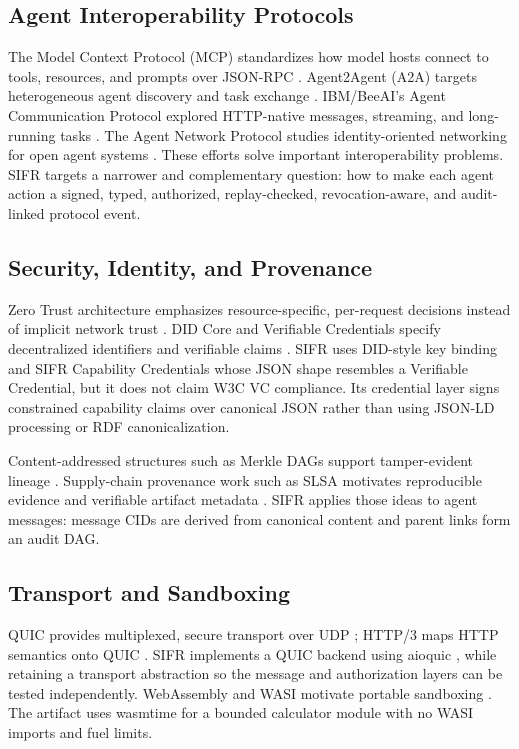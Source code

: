 \documentclass[runningheads]{llncs}
\begin{document}
\subsection{Agent Interoperability Protocols}

The Model Context Protocol (MCP) standardizes how model hosts connect to tools, resources, and prompts over JSON-RPC \cite{mcp2024spec,anthropic2024mcp}. Agent2Agent (A2A) targets heterogeneous agent discovery and task exchange \cite{a2a2025spec,google2025a2a}. IBM/BeeAI's Agent Communication Protocol explored HTTP-native messages, streaming, and long-running tasks \cite{beeai2025acp,ibm2025acp}. The Agent Network Protocol studies identity-oriented networking for open agent systems \cite{chang2025anp,anp2025didwba}. These efforts solve important interoperability problems. SIFR targets a narrower and complementary question: how to make each agent action a signed, typed, authorized, replay-checked, revocation-aware, and audit-linked protocol event.

\subsection{Security, Identity, and Provenance}

Zero Trust architecture emphasizes resource-specific, per-request decisions instead of implicit network trust \cite{rose2020zerotrust}. DID Core and Verifiable Credentials specify decentralized identifiers and verifiable claims \cite{w3c2022did,w3c2025vc}. SIFR uses DID-style key binding and SIFR Capability Credentials whose JSON shape resembles a Verifiable Credential, but it does not claim W3C VC compliance. Its credential layer signs constrained capability claims over canonical JSON rather than using JSON-LD processing or RDF canonicalization.

Content-addressed structures such as Merkle DAGs support tamper-evident lineage \cite{ipfs2025merkledag}. Supply-chain provenance work such as SLSA motivates reproducible evidence and verifiable artifact metadata \cite{slsa2025spec}. SIFR applies those ideas to agent messages: message CIDs are derived from canonical content and parent links form an audit DAG.

\subsection{Transport and Sandboxing}

QUIC provides multiplexed, secure transport over UDP \cite{iyengar2021quic}; HTTP/3 maps HTTP semantics onto QUIC \cite{bishop2022http3}. SIFR implements a QUIC backend using aioquic \cite{aioquic}, while retaining a transport abstraction so the message and authorization layers can be tested independently. WebAssembly and WASI motivate portable sandboxing \cite{w3c2019wasm,wasi2024interfaces}. The artifact uses wasmtime \cite{wasmtime} for a bounded calculator module with no WASI imports and fuel limits.
\end{document}
